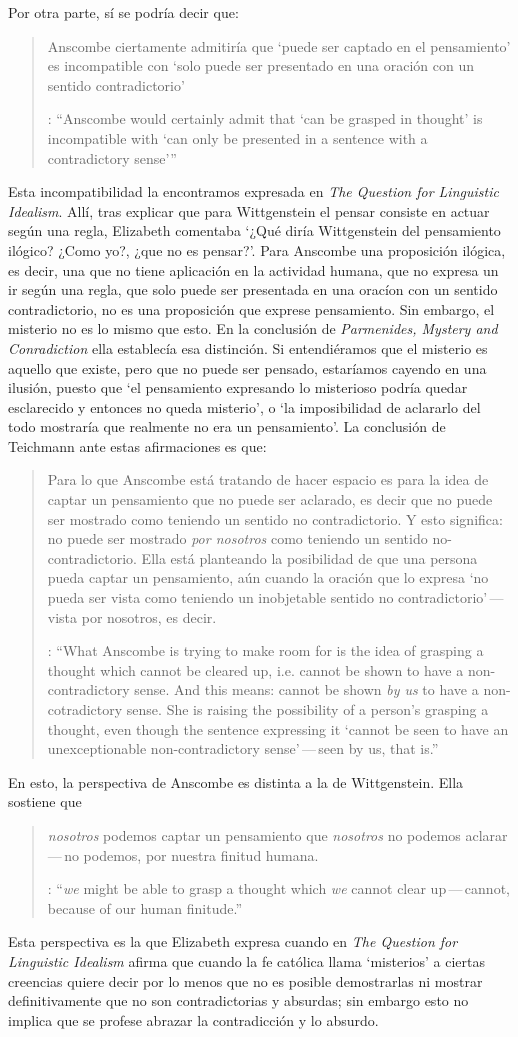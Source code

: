   Por otra parte, sí se podría decir que: \blockquote[{\cite[212]{teichmann2008ans}}: \enquote{Anscombe would certainly admit that `can be grasped in thought' is incompatible with `can only be presented in a sentence with a contradictory sense'}]{Anscombe ciertamente admitiría que `puede ser captado en el pensamiento' es incompatible con `solo puede ser presentado en una oración con un sentido contradictorio'}. Esta incompatibilidad la encontramos expresada en \emph{The Question for Linguistic Idealism}. Allí, tras explicar que para Wittgenstein el pensar consiste en actuar según una regla, Elizabeth comentaba \enquote*{¿Qué diría Wittgenstein del pensamiento ilógico? ¿Como yo?, ¿que no es pensar?}. Para Anscombe una proposición ilógica, es decir, una que no tiene aplicación en la actividad humana, que no expresa un ir según una regla, que solo puede ser presentada en una oracíon con un sentido contradictorio, no es una proposición que exprese pensamiento. Sin embargo, el misterio no es lo mismo que esto. En la conclusión de \emph{Parmenides, Mystery and Conradiction} ella establecía esa distinción. Si entendiéramos que el misterio es aquello que existe, pero que no puede ser pensado, estaríamos cayendo en una ilusión, puesto que \enquote*{el pensamiento expresando lo misterioso podría quedar esclarecido y entonces no queda misterio}, o \enquote*{la imposibilidad de aclararlo del todo mostraría que realmente no era un pensamiento}. La conclusión de Teichmann ante estas afirmaciones es que: \blockquote[{\cite[212]{teichmann2008ans}}: \enquote{What Anscombe is trying to make room for is the idea of grasping a thought which cannot be cleared up, i.e. cannot be shown to have a non-contradictory sense. And this means: cannot be shown \emph{by us} to have a non-cotradictory sense. She is raising the possibility of a person's grasping a thought, even though the sentence expressing it `cannot be seen to have an unexceptionable non-contradictory sense'\,---\,seen by us, that is.}]{Para lo que Anscombe está tratando de hacer espacio es para la idea de captar un pensamiento que no puede ser aclarado, es decir que no puede ser mostrado como teniendo un sentido no contradictorio. Y esto significa: no puede ser mostrado \emph{por nosotros} como teniendo un sentido no-contradictorio. Ella está planteando la posibilidad de que una persona pueda captar un pensamiento, aún cuando la oración que lo expresa `no pueda ser vista como teniendo un inobjetable sentido no contradictorio'\,---\,vista por nosotros, es decir.}

  En esto, la perspectiva de Anscombe es distinta a la de Wittgenstein. Ella sostiene que \blockquote[{\cite[213]{teichmann2008ans}}: \enquote{\emph{we} might be able to grasp a thought which \emph{we} cannot clear up\,---\,cannot, because of our human finitude.}]{\emph{nosotros} podemos captar un pensamiento que \emph{nosotros} no podemos aclarar\,---\,no podemos, por nuestra finitud humana.} Esta perspectiva es la que Elizabeth expresa cuando en \emph{The Question for Linguistic Idealism} afirma que cuando la fe católica llama `misterios' a ciertas creencias quiere decir por lo menos que no es posible demostrarlas ni mostrar definitivamente que no son contradictorias y absurdas; sin embargo esto no implica que se profese abrazar la contradicción y lo absurdo.

